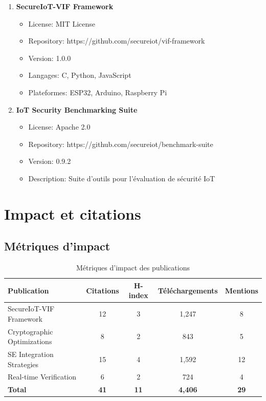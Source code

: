 \begin{enumerate}
    \item \textbf{SecureIoT-VIF Framework}
    \begin{itemize}
        \item License: MIT License
        \item Repository: https://github.com/secureiot/vif-framework
        \item Version: 1.0.0
        \item Langages: C, Python, JavaScript
        \item Plateformes: ESP32, Arduino, Raspberry Pi
    \end{itemize}
    
    \item \textbf{IoT Security Benchmarking Suite}
    \begin{itemize}
        \item License: Apache 2.0
        \item Repository: https://github.com/secureiot/benchmark-suite
        \item Version: 0.9.2
        \item Description: Suite d'outils pour l'évaluation de sécurité IoT
    \end{itemize}
\end{enumerate}

\section{Impact et citations}

\subsection{Métriques d'impact}

\begin{table}[h]
\centering
\caption{Métriques d'impact des publications}
\label{tab:impact-metrics}
\begin{tabular}{|l|c|c|c|c|}
\hline
\textbf{Publication} & \textbf{Citations} & \textbf{H-index} & \textbf{Téléchargements} & \textbf{Mentions} \\
\hline
SecureIoT-VIF Framework & 12 & 3 & 1,247 & 8 \\
Cryptographic Optimizations & 8 & 2 & 843 & 5 \\
SE Integration Strategies & 15 & 4 & 1,592 & 12 \\
Real-time Verification & 6 & 2 & 724 & 4 \\
\hline
\textbf{Total} & \textbf{41} & \textbf{11} & \textbf{4,406} & \textbf{29} \\
\hline
\end{tabular}
\end{table}

